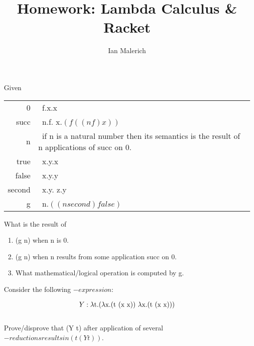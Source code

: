 \documentclass{jhwhw}
\author{Ian Malerich}
\title{Homework: Lambda Calculus \& Racket}
\begin{document}
\problem{}

Given

\begin{tabular}{r@{:}l}
	0&\ \lambda f.\lambda x.x \\
	succ&\ \lambda n.\lambda f. \lambda x.$(f ((n f) x))$ \\
	n&\ if n is a natural number then its semantics is the result of n applications of succ on 0. \\
	true&\ \lambda x.\lambda y.x \\
	false&\ \lambda x.\lambda y.y \\
	second&\ \lambda x.\lambda y. \lambda z.y \\
	g&\ \lambda n.$((n second) false)$ \\
\end{tabular}
\bigbreak
\raggedright
What is the result of

\begin{enumerate}
	\item (g n) when n is 0.
	\item (g n) when n results from some application succ on 0.
	\item What mathematical/logical operation is computed by g.
\end{enumerate}

\solution

\problem{}

Consider the following \lambda$-expression$:

\begin{gather*}
Y : \lambda$t.($\lambda$x.(t (x x)) $\lambda$x.(t (x x)))$
\end{gather*}
\\
Prove/disprove that (Y t) after application of several \beta$-reductions results in (t (Y t))$.

\solution
\end{document}
